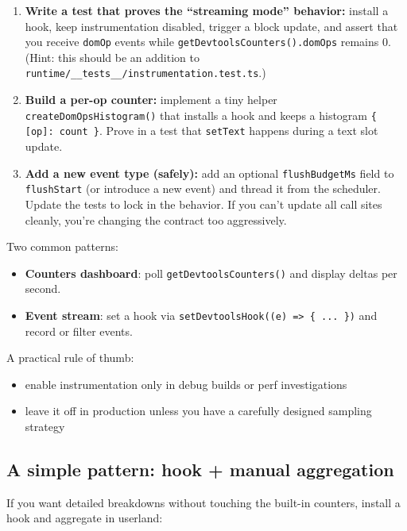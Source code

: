 \begin{enumerate}
\item \textbf{Write a test that proves the ``streaming mode'' behavior:}
			install a hook, keep instrumentation disabled, trigger a block update, and assert that you receive \texttt{domOp} events while \texttt{getDevtoolsCounters().domOps} remains 0.
			(Hint: this should be an addition to \texttt{runtime/\_\_tests\_\_/instrumentation.test.ts}.)

\item \textbf{Build a per-op counter:}
			implement a tiny helper \texttt{createDomOpsHistogram()} that installs a hook and keeps a histogram \texttt{\{ [op]: count \}}.
			Prove in a test that \texttt{setText} happens during a text slot update.

\item \textbf{Add a new event type (safely):}
			add an optional \texttt{flushBudgetMs} field to \texttt{flushStart} (or introduce a new event) and thread it from the scheduler.
			Update the tests to lock in the behavior.
			If you can't update all call sites cleanly, you're changing the contract too aggressively.
\end{enumerate}

Two common patterns:

\begin{itemize}
\item \textbf{Counters dashboard}: poll \texttt{getDevtoolsCounters()} and display deltas per second.
\item \textbf{Event stream}: set a hook via \texttt{setDevtoolsHook((e) => \{ ... \})} and record or filter events.
\end{itemize}

A practical rule of thumb:

\begin{itemize}
\item enable instrumentation only in debug builds or perf investigations
\item leave it off in production unless you have a carefully designed sampling strategy
\end{itemize}

\subsection{A simple pattern: hook + manual aggregation}

If you want detailed breakdowns without touching the built-in counters, install a hook and aggregate in userland:

